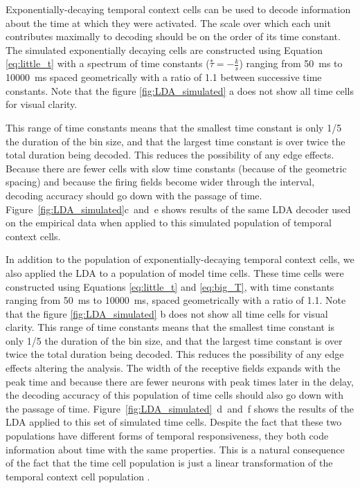 \documentclass{apa}
\newcommand{\taustar}{\ensuremath{\overset{*}{\tau}}}
\begin{document}
Exponentially-decaying temporal context cells can be used to decode
information about the time at which they were activated.  The scale over which
each unit contributes maximally to decoding should be on the order of its time
constant.
The simulated exponentially decaying cells are constructed using Equation \eqref{eq:little_t} with a 
spectrum of time constants ($\taustar=-\frac{k}{s}$) ranging from 50~ms to 10000~ms spaced geometrically with a ratio of 1.1 between successive time constants.  Note that the figure \ref{fig:LDA_simulated} a does not show all time cells for visual clarity.

This range of time constants means that the smallest time constant is only 1/5 the duration of the bin size, and that the largest time constant is over twice the total duration being decoded.  This reduces the possibility of any edge effects.
Because there are fewer cells with slow time constants (because of the geometric spacing) and because the firing fields become wider through the interval, decoding accuracy should go down with the
passage of time.  
Figure~\ref{fig:LDA_simulated}c~and~e shows results of the same LDA decoder used on
the empirical data when applied to this simulated population of  temporal
context cells.  

In addition to the population of exponentially-decaying temporal context
cells, we also applied the LDA to a population of model time cells.  
These time cells were constructed using Equations \eqref{eq:little_t} and \eqref{eq:big_T}, with time constants ranging from 50~ms to 10000~ms, spaced geometrically with a ratio of 1.1. 
Note that the figure \ref{fig:LDA_simulated} b does not show all time cells for visual clarity.
This range of time constants means that the smallest time constant is only 1/5 the duration of the bin size, and that the largest time constant is over twice the total duration being decoded.  This reduces the possibility of any edge effects altering the analysis.
 The width of the receptive fields expands with the peak time and
because there are fewer neurons with peak times later in the delay, the
decoding accuracy of this population of time cells should also go down with
the passage of time.
Figure~\ref{fig:LDA_simulated}~d~and~f shows the results of the LDA applied to
this set of simulated time cells.  Despite the fact that these two populations
have different forms of temporal responsiveness, they both code information
about time with the same properties.  This is a natural consequence of the
fact that the time cell population is just a linear transformation of the
temporal context cell population \cite{ShanHowa13}. 
\end{document}
